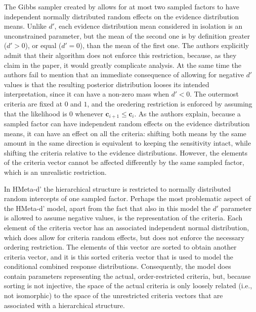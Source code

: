 \documentclass[oneside,a4paper]{article}
\begin{document}
The Gibbs sampler created by  allows for
at most two sampled factors to have independent normally distributed
random effects on the evidence distribution means. Unlike $d'$, each
evidence distribution mean considered in isolation is an unconstrained
parameter, but the mean of the second one is by definition greater
($d' > 0$), or equal ($d' = 0$), than the mean of the first one. The
authors explicitly admit that their algorithm does not enforce this
restriction, because, as they claim in the paper, it would greatly
complicate analysis. At the same time the authors fail to mention that
an immediate consequence of allowing for negative $d'$ values is that
the resulting posterior distribution looses its intended
interpretation, since it can have a non-zero mass when $d' < 0$. The
outermost criteria are fixed at $0$ and $1$, and the oredering
restriction is enforced by assuming that the likelihood is $0$
whenever $\bm{c}_{i+1} \leq \bm{c}_i$. As the authors explain, because
a sampled factor can have independent random effects on the evidence
distribution means, it can have an effect on all the criteria:
shifting both means by the same amount in the same direction is
equivalent to keeping the sensitivity intact, while shifting the
criteria relative to the evidence distributions. However, the elements
of the criteria vector cannot be affected differently by the same
sampled factor, which is an unrealistic restriction.

In HMeta-d' the hierarchical structure is restricted to normally
distributed random intercepts of one sampled factor. Perhaps the most
problematic aspect of the HMeta-d' model, apart from the fact that
also in this model the $d'$ parameter is allowed to assume negative
values, is the representation of the criteria. Each element of the
criteria vector has an associated independent normal distribution,
which does allow for criteria random effects, but does not enforce the
necessary ordering restriction. The elements of this vector are sorted
to obtain another criteria vector, and it is this sorted criteria
vector that is used to model the conditional combined response
distributions. Consequently, the model does contain parameters
representing the actual, order-restricted criteria, but, because
sorting is not injective, the
space of the actual criteria is only loosely related (i.e., not
isomorphic) to the space of the unrestricted criteria vectors that are
associated with a hierarchical structure.

\end{document}

